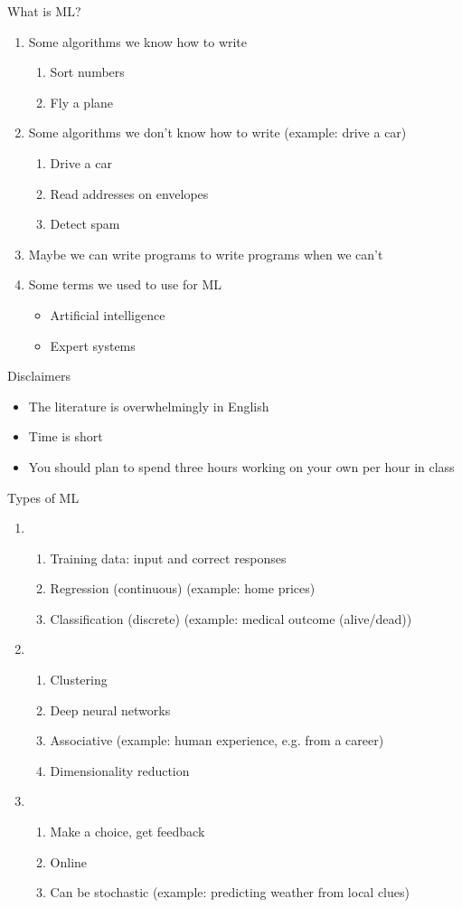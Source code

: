 What is ML?
\begin{enumerate}
\item Some algorithms we know how to write
  \begin{enumerate}
  \item Sort numbers
  \item Fly a plane
  \end{enumerate}
\item Some algorithms we don't know how to write (example: drive a car)
  \begin{enumerate}
  \item Drive a car 
  \item Read addresses on envelopes
  \item Detect spam
  \end{enumerate}
\item Maybe we can write programs to write programs when we can't
\item Some terms we used to use for ML
  \begin{itemize}
  \item Artificial intelligence
  \item Expert systems
  \end{itemize}
\end{enumerate}

Disclaimers
\begin{itemize}
\item The literature is overwhelmingly in English
\item Time is short
\item You should plan to spend three hours working on your own per hour in class
\end{itemize}

Types of ML
\begin{enumerate}
\item {}
  \begin{enumerate}
  \item Training data: input and correct responses
  \item Regression (continuous) (example: home prices)
  \item Classification (discrete) (example: medical outcome (alive/dead))
  \end{enumerate}
\item {}
  \begin{enumerate}
  \item Clustering
  \item Deep neural networks
  \item Associative (example: human experience, e.g. from a career)
  \item Dimensionality reduction
  \end{enumerate}
\item {}
  \begin{enumerate}
  \item Make a choice, get feedback
  \item Online
  \item Can be stochastic (example: predicting weather from local clues)
  \end{enumerate}
\end{enumerate}

